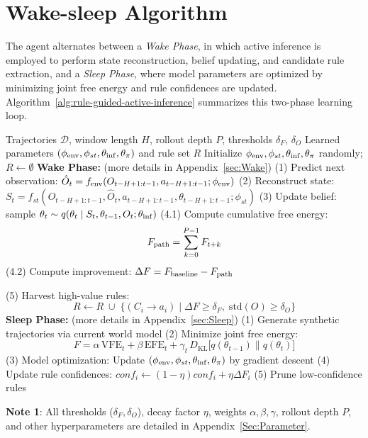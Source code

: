 \documentclass{article} %
\begin{document}
\section{Wake-sleep Algorithm}
\label{Sec:A}
The agent alternates between a \emph{Wake Phase}, in which active inference is employed to perform state reconstruction, belief updating, and candidate rule extraction, and a \emph{Sleep Phase}, where model parameters are optimized by minimizing joint free energy and rule confidences are updated. Algorithm~\ref{alg:rule-guided-active-inference} summarizes this two-phase learning loop.

\begin{algorithm}[htbp]
\caption{Rule‐Guided Active Inference via Wake–Sleep}
\label{alg:rule-guided-active-inference}
\begin{algorithmic}[1]
\Require Trajectories $\mathcal{D}$, window length $H$, rollout depth $P$, thresholds $\delta_F$, $\delta_O$
\Ensure Learned parameters $(\phi_{\rm env},\phi_{st},\theta_{\rm inf},\theta_{\pi})$ and rule set $R$
\State Initialize $\phi_{\rm env},\phi_{st},\theta_{\rm inf},\theta_{\pi}$ randomly; $R\leftarrow\emptyset$
\State \textbf{Wake Phase:} (more details in Appendix~\ref{sec:Wake})
    \State (1) Predict next observation: $\hat O_t=f_{\rm env}(O_{t-H+1:t-1},a_{t-H+1:t-1};\phi_{\rm env})$
    \State (2) Reconstruct state: $S_t=f_{st}(O_{t-H+1:t-1},\hat O_t,a_{t-H+1:t-1},\theta_{t-H+1:t-1};\phi_{st})$
    \State (3) Update belief: sample $\theta_t\sim q(\theta_t\mid S_t,\theta_{t-1},O_t;\theta_{\rm inf})$
      \State (4.1) Compute cumulative free energy:
      $$F_{\rm path}=\sum_{k=0}^{P-1}F_{t+k} $$
      \State (4.2) Compute improvement:  $\Delta F = F_{\rm baseline}-F_{\rm path}$  
      
    \EndFor
    \State (5) Harvest high-value rules:
    $$R\leftarrow R \;\cup\;\{(C_i\to a_i)\mid \Delta F\ge\delta_F,\;\mathrm{std}(O)\ge\delta_O\}$$
  \EndFor
\State \textbf{Sleep Phase:} (more details in Appendix~\ref{sec:Sleep})
  \State (1) Generate synthetic trajectories via current world model
  \State (2) Minimize joint free energy:
  \[    F=\alpha\,\mathrm{VFE}_t+\beta\,\mathrm{EFE}_t+\gamma_{t}\,D_{\mathrm{KL}}\bigl[q(\theta_{t-1})\|q(\theta_t)\bigr]
  \]
  \State (3) Model optimization: Update $(\phi_{\rm env},\phi_{st},\theta_{\rm inf},\theta_{\pi})$ by gradient descent
  \State (4) Update rule confidences: $conf_i\leftarrow(1-\eta)conf_i+\eta\Delta F_i$
  \State (5) Prune low-confidence rules
\EndFor
\end{algorithmic}
\end{algorithm}
\noindent\textbf{Note 1}: All thresholds ($\delta_F,\delta_O$), decay factor $\eta$, weights $\alpha,\beta,\gamma$, rollout depth $P$, and other hyperparameters are detailed in Appendix~\ref{Sec:Parameter}.
\end{document}
